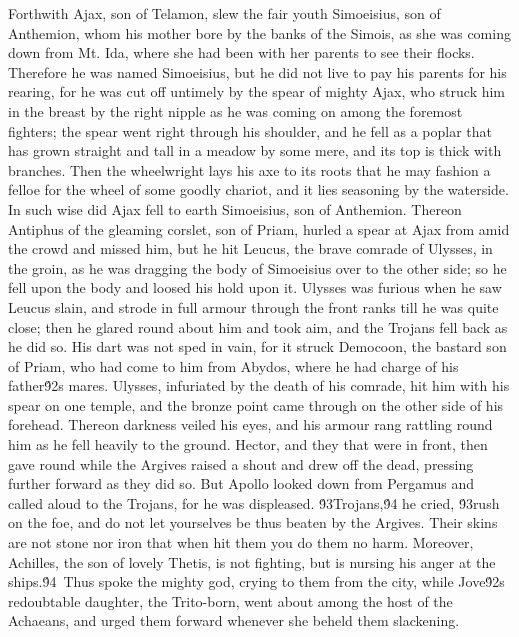 {Forthwith Ajax, son of Telamon, slew the fair youth Simoeisius, son of Anthemion, whom his mother bore by the banks of the Simois, as she was coming down from Mt. Ida, where she had been with her parents to see their flocks. Therefore he was named Simoeisius, but he did not live to pay his parents for his rearing, for he was cut off untimely by the spear of mighty Ajax, who struck him in the breast by the right nipple as he was coming on among the foremost fighters; the spear went right through his shoulder, and he fell as a poplar that has grown straight and tall in a meadow by some mere, and its top is thick with branches. Then the wheelwright lays his axe to its roots that he may fashion a felloe for the wheel of some goodly chariot, and it lies seasoning by the waterside. In such wise did Ajax fell to earth Simoeisius, son of Anthemion. Thereon Antiphus of the gleaming corslet, son of Priam, hurled a spear at Ajax from amid the crowd and missed him, but he hit Leucus, the brave comrade of Ulysses, in the groin, as he was dragging the body of Simoeisius over to the other side; so he fell upon the body and loosed his hold upon it. Ulysses was furious when he saw Leucus slain, and strode in full armour through the front ranks till he was quite close; then he glared round about him and took aim, and the Trojans fell back as he did so. His dart was not sped in vain, for it struck Democoon, the bastard son of Priam, who had come to him from Abydos, where he had charge of his father\'92s mares. Ulysses, infuriated by the death of his comrade, hit him with his spear on one temple, and the bronze point came through on the other side of his forehead. Thereon darkness veiled his eyes, and his armour rang rattling round him as he fell heavily to the ground. Hector, and they that were in front, then gave round while the Argives raised a shout and drew off the dead, pressing further forward as they did so. But Apollo looked down from Pergamus and called aloud to the Trojans, for he was displeased. \'93Trojans,\'94 he cried, \'93rush on the foe, and do not let yourselves be thus beaten by the Argives. Their skins are not stone nor iron that when hit them you do them no harm. Moreover, Achilles, the son of lovely Thetis, is not fighting, but is nursing his anger at the ships.\'94\
Thus spoke the mighty god, crying to them from the city, while Jove\'92s redoubtable daughter, the Trito-born, went about among the host of the Achaeans, and urged them forward whenever she beheld them slackening.\
}
